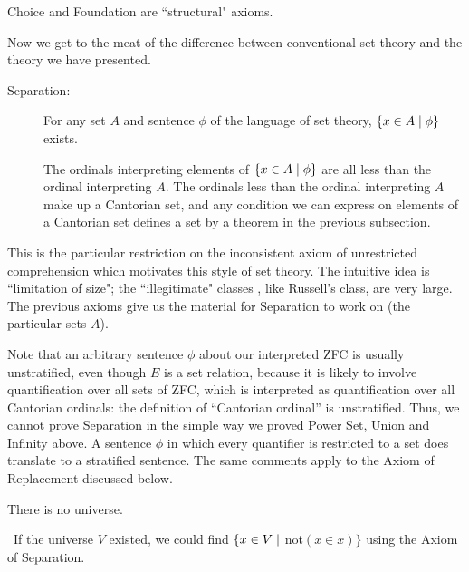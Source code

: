 Choice and Foundation are ``structural" axioms.

Now we get to the meat of the difference between conventional
set theory and the theory we have presented.

\begin{description}
 \item[\fdescr Separation:]  For any set $A$
   and sentence $\phi$ of the language of set theory, $\{x \in A \mid \phi\}$
   exists.

   \preuve The ordinals interpreting elements of $\{x
   \in A \mid \phi\}$ are all less than the ordinal interpreting $A$.  The
   ordinals less than the ordinal interpreting $A$ make up a
   Cantorian set, and any condition we can express on
   elements of a Cantorian set defines a set by a theorem in the previous
   subsection.
   \finpreuve
\end{description}

This is the particular restriction on the inconsistent axiom
of unrestricted comprehension which motivates this style
of set theory.  The intuitive idea is ``limitation of size"; the
``illegitimate" classes , like Russell's class, are very large.  The
previous axioms give us the material for Separation to work on (the particular sets $A$).  

Note that an arbitrary sentence $\phi$ about our interpreted
ZFC is usually
unstratified, even though $E$ is a set relation,
because it is likely to involve quantification over all sets of
ZFC, which is interpreted as quantification over all
Cantorian ordinals: the
definition of ``Cantorian ordinal'' is unstratified.
Thus, we cannot prove Separation in the simple way we proved Power
Set, Union and Infinity above.  A sentence
$\phi$ in which every quantifier is restricted to a set does translate to a
stratified sentence.  The same comments apply to the
Axiom of Replacement 
discussed below.

\begin{thm}
 There is no universe.
\end{thm}

\preuve\ If the universe $V$ existed, we could find $\{x \in V \mid$ not$(x \in
x)\}$ using the Axiom of Separation.
\finpreuve

